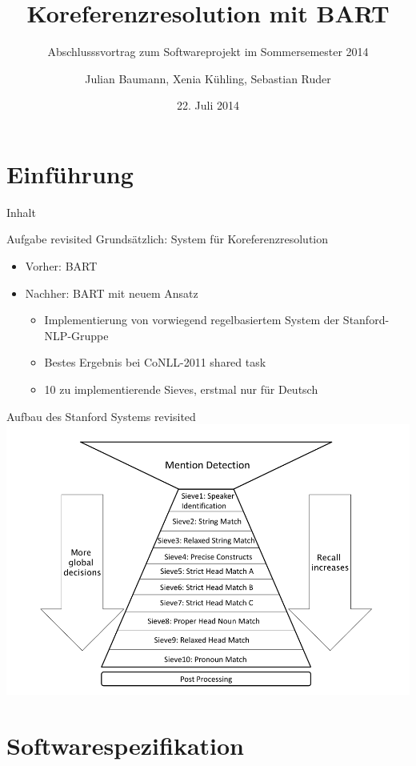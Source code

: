 \documentclass[11pt,a4paper]{beamer}
\author{Julian Baumann, Xenia Kühling, Sebastian Ruder}
\title{Koreferenzresolution mit BART}
\subtitle{Abschlusssvortrag zum Softwareprojekt im Sommersemester 2014}
\date{22. Juli 2014}
\begin{document}
\maketitle

\section{Einführung}

\begin{frame}{Inhalt}
\tableofcontents
\end{frame}

\begin{frame}{Aufgabe revisited}
Grundsätzlich: System für Koreferenzresolution
\begin{itemize}
\item Vorher: BART
\item Nachher: BART mit neuem Ansatz
\begin{itemize}
\item Implementierung von vorwiegend regelbasiertem System der Stanford-NLP-Gruppe
\item Bestes Ergebnis bei CoNLL-2011 shared task
\item 10 zu implementierende Sieves, erstmal nur für Deutsch
\end{itemize}
\end{itemize}
\end{frame}


\begin{frame}{Aufbau des Stanford Systems revisited}
\includegraphics[scale=0.29]{stanford.png}
\end{frame}


\section{Softwarespezifikation}
\end{document}
